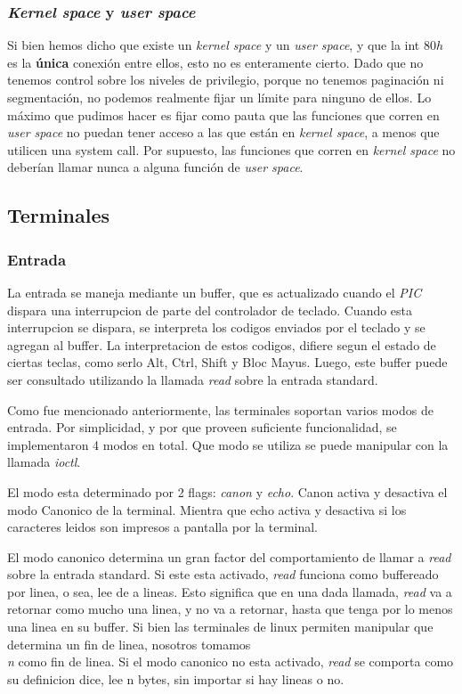 \documentclass[a4paper,10pt]{article}
\begin{document}
	\subsubsection{\textit{Kernel space} y \textit{user space}}
	    Si bien hemos dicho que existe un \textit{kernel space} y un \textit{user space}, y que la int $80h$ es la \textbf{única} conexión entre ellos, esto no es 
	    enteramente cierto. Dado que no tenemos control sobre los niveles de privilegio, porque no tenemos paginación ni segmentación, no podemos realmente fijar un
	    límite para ninguno de ellos. Lo máximo que pudimos hacer es fijar como pauta que las funciones que corren en \textit{user space} no puedan tener acceso a
	    las que están en \textit{kernel space}, a menos que utilicen una system call. Por supuesto, las funciones que corren en \textit{kernel space} no deberían 
	    llamar nunca a alguna función de \textit{user space}.

    \subsection{Terminales}
        \subsubsection{Entrada}
            La entrada se maneja mediante un buffer, que es actualizado cuando el \textit{PIC} dispara una interrupcion de parte del controlador de teclado.
            Cuando esta interrupcion se dispara, se interpreta los codigos enviados por el teclado y se agregan al buffer.
            La interpretacion de estos codigos, difiere segun el estado de ciertas teclas, como serlo Alt, Ctrl, Shift y Bloc Mayus.
            Luego, este buffer puede ser consultado utilizando la llamada \textit{read} sobre la entrada standard.

            Como fue mencionado anteriormente, las terminales soportan varios modos de entrada.
            Por simplicidad, y por que proveen suficiente funcionalidad, se implementaron 4 modos en total.
            Que modo se utiliza se puede manipular con la llamada \textit{ioctl}.

            El modo esta determinado por 2 flags: \textit{canon} y \textit{echo}.
            Canon activa y desactiva el modo Canonico de la terminal.
            Mientra que echo activa y desactiva si los caracteres leidos son impresos a pantalla por la terminal.

            El modo canonico determina un gran factor del comportamiento de llamar a \textit{read} sobre la entrada standard.
            Si este esta activado, \textit{read} funciona como buffereado por linea, o sea, lee de a lineas.
            Esto significa que en una dada llamada, \textit{read} va a retornar como mucho una linea, y no va a retornar, hasta que tenga por lo menos una linea en su buffer.
            Si bien las terminales de linux permiten manipular que determina un fin de linea, nosotros tomamos \textit{\\n} como fin de linea.
            Si el modo canonico no esta activado, \textit{read} se comporta como su definicion dice, lee n bytes, sin importar si hay lineas o no.
\end{document}
